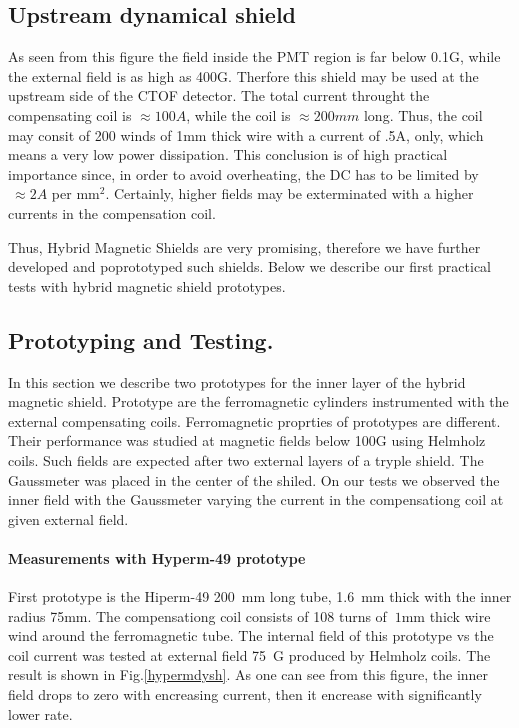 \documentclass[12pt]{article}
\begin{document}
\subsection{Upstream dynamical shield}
As seen from this figure the  field inside the PMT region is  far  below 0.1G,  
while the  external field is as high as 400G. Therfore this  shield may be used at the 
upstream side of the CTOF detector.
%
%
The total current  throught the compensating  coil is  $\approx100A$,
while  the coil is  $\approx200mm$ long.
Thus, the coil  may consit of  200 winds  of 1mm thick wire  with a current of .5A, only, which means a very low power dissipation.
This conclusion is of high  practical importance since, in order to avoid overheating,
 the  DC has to be  limited by $~\approx 2A$ per mm$^2$.
Certainly,  higher fields may be  exterminated with a higher
currents in the  compensation coil.

Thus, Hybrid Magnetic Shields are very promising, therefore
we have  further  developed   and poprototyped  such shields.
Below we describe our first practical tests with hybrid magnetic shield prototypes.

\subsection{Prototyping and Testing.}

In this section  we describe two  prototypes for  the inner layer of the hybrid
 magnetic shield.  Prototype are the ferromagnetic cylinders
instrumented  with the external  compensating coils.
Ferromagnetic proprties of prototypes are  different.
Their  performance was studied  at    magnetic fields below 100G using Helmholz coils.
Such fields are  expected  after  two  external layers of  a tryple  shield.
The Gaussmeter was placed in the center of the
shiled. On our tests we observed the inner field with the
Gaussmeter varying the current in the compensationg coil at given external field.

\paragraph{Measurements with Hyperm-49 prototype}
First   prototype is the Hiperm-49 200~mm long tube,  
1.6~mm thick with the inner radius 75mm.
The compensationg coil consists of 108
 turns of $~1$mm thick wire wind around the ferromagnetic tube.
 The internal field of this  prototype vs the coil current 
 was tested at external field
75~G  produced by Helmholz coils. 
The result is shown  in Fig.\ref{hypermdysh}.
As one can see from this figure, the inner field 
drops to zero with encreasing current, then it
encrease  with  significantly lower rate.
\end{document}
